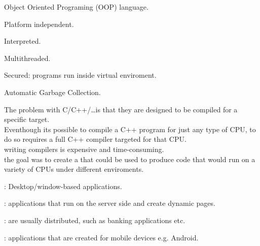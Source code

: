 \begin{sectionbox}\nospacing
  \begin{itemizenosep}
      \item Object Oriented Programing (OOP) language.
      \item Platform independent.
      \item Interpreted.
      \item Multithreaded.
      \item Secured: programs run inside virtual enviroment.
      \item Automatic Garbage Collection.
  \end{itemizenosep}
\end{sectionbox}
\begin{notebox}\nospacing
  The problem with C/C++/\ldots is that they are designed to be compiled for
  a specific target.\\
  Eventhough its possible to compile a C++ program for just any type of CPU, to
  do so requires a full C++ compiler targeted for that CPU.\\
   writing compilers is expensive and time-consuming.\\
   the goal was to create a 
  that could be used to produce code that would run on a variety of CPUs under
  different enviroments.
\end{notebox}
\begin{notebox}\nospacing
  \begin{numberlist}
      \item {}: Desktop/window-based applications.
      \item {}: applications that run on the server side and
    create dynamic pages.
      \item {}: are usually distributed, such as
    banking applications etc.
      \item {}: applications that are created for mobile
    devices e.g. Android.
  \end{numberlist}
\end{notebox}
